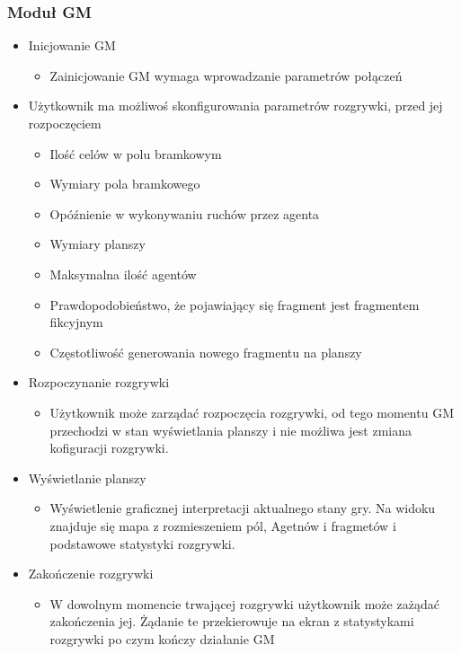 \documentclass[../Dokumentacja.tex]{subfiles}
\begin{document}
\subsubsection{Moduł GM}
\begin{itemize}
	\item Inicjowanie GM
	\begin{itemize}
		\item Zainicjowanie GM wymaga wprowadzanie parametrów połączeń
	\end{itemize}
	\item Użytkownik ma możliwoś skonfigurowania parametrów rozgrywki, przed jej rozpoczęciem
	\begin{itemize}
		\item Ilość celów w polu bramkowym
		\item Wymiary pola bramkowego
		\item Opóźnienie w wykonywaniu ruchów przez agenta
		\item Wymiary planszy
		\item Maksymalna ilość agentów
		\item Prawdopodobieństwo, że pojawiający się fragment jest fragmentem fikcyjnym
		\item Częstotliwość generowania nowego fragmentu na planszy
	\end{itemize}
	\item Rozpoczynanie rozgrywki
	\begin{itemize}
		\item Użytkownik może zarządać rozpoczęcia rozgrywki, od tego momentu GM przechodzi w stan wyświetlania planszy i nie możliwa jest zmiana kofiguracji rozgrywki.
	\end{itemize}
	\item Wyświetlanie planszy
	\begin{itemize}
		\item Wyświetlenie graficznej interpretacji aktualnego stany gry. Na widoku znajduje się mapa z rozmieszeniem pól, Agetnów i fragmetów i podstawowe statystyki rozgrywki.
	\end{itemize}
	\item Zakończenie rozgrywki
	\begin{itemize}
		\item W dowolnym momencie trwającej rozgrywki użytkownik może zażądać zakończenia jej. Żądanie te przekierowuje na ekran z statystykami rozgrywki po czym kończy działanie GM
	\end{itemize}
\end{itemize}
\end{document}

